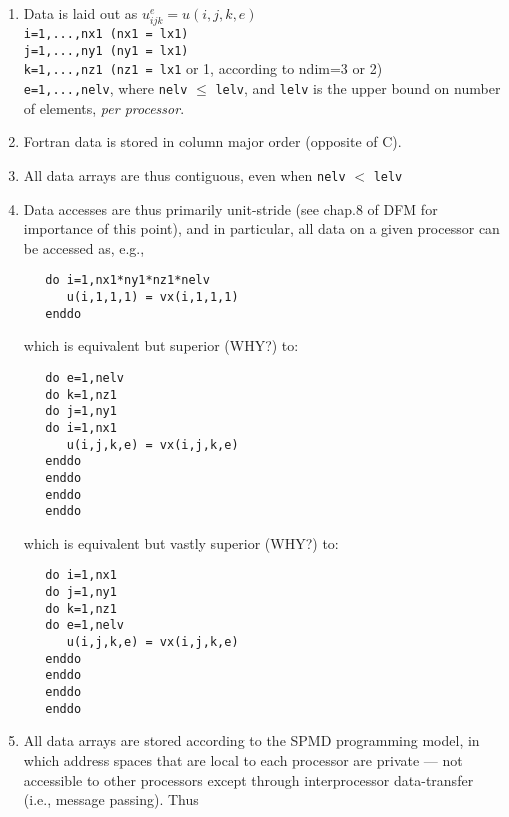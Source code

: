 \begin{enumerate}
\item
Data is laid out as  \(u_{ijk}^e = u(i,j,k,e)\) \\

{\tt   i=1,...,nx1   (nx1 = lx1)} \\
{\tt   j=1,...,ny1   (ny1 = lx1)} \\
{\tt   k=1,...,nz1   (nz1 = lx1} or 1, according to ndim=3 or 2) \\

{\tt   e=1,...,nelv}, where {\tt nelv} \(\le\) {\tt lelv}, and {\tt lelv} is the upper
                 bound on number of elements, {\em per processor}.


\item
 Fortran data is stored in column major order (opposite of C).

\item
 All data arrays are thus contiguous, even when {\tt nelv} \(<\) {\tt lelv}

\item Data accesses are thus primarily unit-stride (see chap.8 of DFM
   for importance of this point), and in particular, all data on
   a given processor can be accessed as, e.g.,


\begin{verbatim}
   do i=1,nx1*ny1*nz1*nelv
      u(i,1,1,1) = vx(i,1,1,1)
   enddo
\end{verbatim}

   which is equivalent but superior (WHY?) to:

\begin{verbatim}
   do e=1,nelv
   do k=1,nz1
   do j=1,ny1
   do i=1,nx1
      u(i,j,k,e) = vx(i,j,k,e)
   enddo
   enddo
   enddo
   enddo
\end{verbatim}


   which is equivalent but vastly superior (WHY?) to:

\begin{verbatim}
   do i=1,nx1
   do j=1,ny1
   do k=1,nz1
   do e=1,nelv
      u(i,j,k,e) = vx(i,j,k,e)
   enddo
   enddo
   enddo
   enddo
\end{verbatim}


\item All data arrays are stored according to the SPMD programming
   model, in which address spaces that are local to each processor
   are private --- not accessible to other processors except through
   interprocessor data-transfer (i.e., message passing).  Thus


\end{enumerate}
